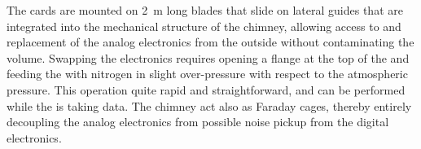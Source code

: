 
The  cards are mounted on \SI{2}{m} long blades that slide on lateral guides that are integrated into the mechanical structure of the chimney, allowing access to and replacement of the analog  electronics from the outside without contaminating the \lar volume. 
Swapping the  electronics requires opening a flange at the top of the  and feeding the  with nitrogen in slight over-pressure with respect to the atmospheric pressure.  This operation quite rapid and straightforward, and can be performed while the  is taking data. The chimney act also as Faraday cages, thereby entirely decoupling the analog  electronics %
from possible noise pickup from the digital electronics.   



